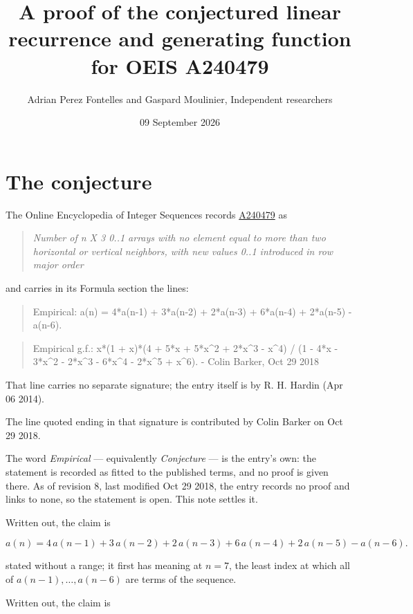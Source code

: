 \documentclass[11pt]{article}
\title{A proof of the conjectured linear recurrence and generating function for OEIS A240479}
\author{Adrian Perez Fontelles and Gaspard Moulinier, Independent researchers}
\date{09 September 2026}
\theoremstyle{definition}
\begin{document}
\maketitle
\section{The conjecture}

The Online Encyclopedia of Integer Sequences records \href{https://oeis.org/A240479}{A240479} as

\begin{quote}\itshape Number of n X 3 0..1 arrays with no element equal to more than two horizontal or vertical neighbors, with new values 0..1 introduced in row major order\end{quote}

and carries in its Formula section the lines:

\begin{quote}\ttfamily Empirical: a(n) = 4*a(n-1) + 3*a(n-2) + 2*a(n-3) + 6*a(n-4) + 2*a(n-5) - a(n-6).\end{quote}

\begin{quote}\ttfamily Empirical g.f.: x*(1 + x)*(4 + 5*x + 5*x\textasciicircum{}2 + 2*x\textasciicircum{}3 - x\textasciicircum{}4) / (1 - 4*x - 3*x\textasciicircum{}2 - 2*x\textasciicircum{}3 - 6*x\textasciicircum{}4 - 2*x\textasciicircum{}5 + x\textasciicircum{}6). - Colin Barker, Oct 29 2018\end{quote}

That line carries no separate signature; the entry itself is by R. H. Hardin (Apr 06 2014).

The line quoted ending in that signature is contributed by Colin Barker on Oct 29 2018.

The word {\itshape Empirical} --- equivalently {\itshape Conjecture} --- is the entry's own: the statement is recorded as fitted to the published terms, and no proof is given there. As of revision 8, last modified Oct 29 2018, the entry records no proof and links to none, so the statement is open. This note settles it.

Written out, the claim is

\[a(n) = 4\,a(n-1) + 3\,a(n-2) + 2\,a(n-3) + 6\,a(n-4) + 2\,a(n-5) - a(n-6).\]

stated without a range; it first has meaning at $n = 7$, the least index at which all of $a(n-1),\dots,a(n-6)$ are terms of the sequence.

Written out, the claim is
\end{document}
